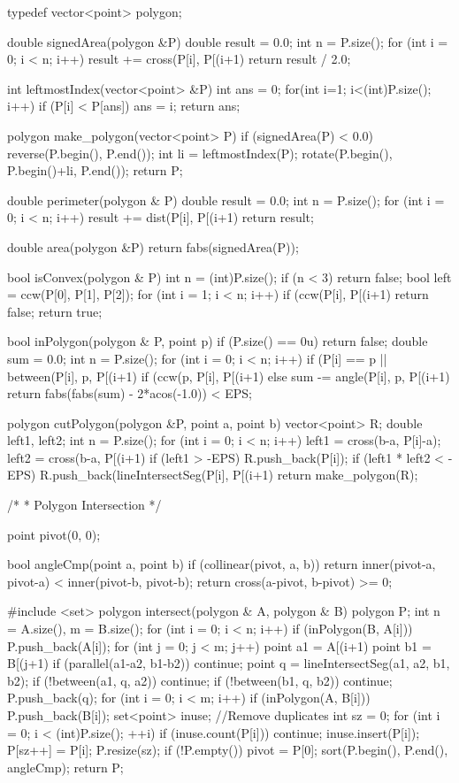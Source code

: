 \documentclass[11pt]{article}
\begin{document}
\begin{vncode}
typedef vector<point> polygon;

double signedArea(polygon &P) {
	double result = 0.0;
	int n = P.size();
	for (int i = 0; i < n; i++) {
		result += cross(P[i], P[(i+1)%
	}
	return result / 2.0;
}

int leftmostIndex(vector<point> &P) {
	int ans = 0;
	for(int i=1; i<(int)P.size(); i++) {
		if (P[i] < P[ans]) ans = i;
	}
	return ans;
}

polygon make_polygon(vector<point> P) {
	if (signedArea(P) < 0.0) reverse(P.begin(), P.end());
	int li = leftmostIndex(P);
	rotate(P.begin(), P.begin()+li, P.end());
	return P;
}

double perimeter(polygon & P) {
	double result = 0.0;
	int n = P.size();
	for (int i = 0; i < n; i++) result += dist(P[i], P[(i+1)%
	return result;
}

double area(polygon &P) {
	return fabs(signedArea(P));
}

bool isConvex(polygon & P) {
	int n = (int)P.size();
	if (n < 3) return false;
	bool left = ccw(P[0], P[1], P[2]);
	for (int i = 1; i < n; i++) {
		if (ccw(P[i], P[(i+1)%
			return false;
	}
	return true;
}

bool inPolygon(polygon & P, point p) {
	if (P.size() == 0u) return false;
	double sum = 0.0;
	int n = P.size();
	for (int i = 0; i < n; i++) {
		if (P[i] == p || between(P[i], p, P[(i+1)%
		if (ccw(p, P[i], P[(i+1)%
		else sum -= angle(P[i], p, P[(i+1)%
	}
	return fabs(fabs(sum) - 2*acos(-1.0)) < EPS;
}

polygon cutPolygon(polygon &P, point a, point b) {
	vector<point> R;
	double left1, left2;
	int n = P.size();
	for (int i = 0; i < n; i++) {
		left1 = cross(b-a, P[i]-a);
		left2 = cross(b-a, P[(i+1)%
		if (left1 > -EPS) R.push_back(P[i]);
		if (left1 * left2 < -EPS) 
			R.push_back(lineIntersectSeg(P[i], P[(i+1)%
	}
	return make_polygon(R);
}

/*
 * Polygon Intersection
 */

point pivot(0, 0);

bool angleCmp(point a, point b) {
	if (collinear(pivot, a, b))
		return inner(pivot-a, pivot-a) < inner(pivot-b, pivot-b);
	return cross(a-pivot, b-pivot) >= 0;
}

#include <set>
polygon intersect(polygon & A, polygon & B) {
	polygon P;
	int n = A.size(), m = B.size();
	for (int i = 0; i < n; i++) {
		if (inPolygon(B, A[i])) P.push_back(A[i]);
		for (int j = 0; j < m; j++) {
			point a1 = A[(i+1)%
			point b1 = B[(j+1)%
			if (parallel(a1-a2, b1-b2)) continue;
			point q = lineIntersectSeg(a1, a2, b1, b2);
			if (!between(a1, q, a2)) continue;
			if (!between(b1, q, b2)) continue;
			P.push_back(q);
		}
	}
	for (int i = 0; i < m; i++){
		if (inPolygon(A, B[i])) P.push_back(B[i]);
	}
	set<point> inuse; //Remove duplicates
	int sz = 0;
	for (int i = 0; i < (int)P.size(); ++i){
		if (inuse.count(P[i])) continue;
		inuse.insert(P[i]);
		P[sz++] = P[i];
	}
	P.resize(sz);
	if (!P.empty()){
		pivot = P[0];
		sort(P.begin(), P.end(), angleCmp);
	}
	return P;
}


\end{vncode}
\end{document}
